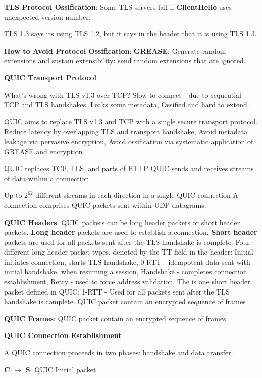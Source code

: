 \documentclass{article}
\begin{document}
\textbf{TLS Protocol Ossification}: Some TLS servers fail if \textbf{ClientHello} uses unexpected version number.

TLS 1.3 says its using TLS 1.2, but it says in the header that it is using TLS 1.3.

\textbf{How to Avoid Protocol Ossification}:
\textbf{GREASE}: Generate random extensions and sustain extensibility: send random extensions that are ignored.

\vspace{\baselineskip}
\textbf{QUIC Transport Protocol}

What's wrong with TLS v1.3 over TCP\@?
Slow to connect {-} due to sequential TCP and TLS handshakes,
Leaks some metadata,
Ossified and hard to extend.

QUIC aims to replace TLS v1.3 and TCP with a single secure transport protocol.
Reduce latency by overlapping TLS and transport handshake,
Avoid metadata leakage via pervasive encryption,
Avoid ossification via systematic application of GREASE and encryption

QUIC replaces TCP, TLS, and parts of HTTP
QUIC sends and receives streams of data within a connection.

Up to $2^{62}$ different streams in each direction in a single QUIC connection
A connection comprises QUIC packets sent within UDP datagrams.

\textbf{QUIC Headers}. QUIC packets can be long header packets or short header packets.
\textbf{Long header} packets are used to establish a connection.
\textbf{Short header} packets are used for all packets sent after the TLS handshake is complete.
Four different long-header packet types, denoted by the TT field in the header:
Initial {-} initiates connection, starts TLS handshake,
0-RTT {-} idempotent data sent with initial handshake, when resuming a session,
Handshake {-} completes connection establishment,
Retry {-} used to force address validation.
The is one short header packet defined in QUIC\@:
1-RTT {-} Used for all packets sent after the TLS handshake is complete. QUIC packet contain an encrypted sequence of frames

\textbf{QUIC Frames}: QUIC packet contain an encrypted sequence of frames.


\vspace{\baselineskip}
\textbf{QUIC Connection Establishment}

A QUIC connection proceeds in two phases: handshake and data transfer.

\textbf{C} $\rightarrow$ \textbf{S}: QUIC Initial packet
\end{document}
